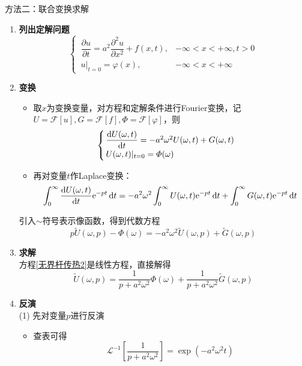 	\solveother 方法二：联合变换求解
\begin{enumerate}
	\item \textbf{列出定解问题}
	\begin{equation}
		\begin{cases}
			\, \dfrac{\partial u}{\partial t} = a^2 \dfrac{\partial^2 u}{\partial x^2} + f(x,t), & -\infty < x< +\infty,t>0\\[0.5em]
			\, u|_{t = 0} = \varphi(x), & -\infty < x < + \infty
		\end{cases}
	\end{equation}
	\item \textbf{变换}
		\begin{itemize}
			\item 取$x$为变换变量，对方程和定解条件进行Fourier变换，记$U = \mathcal{F}[u], G = \mathcal{F}[f], \varPhi = \mathcal{F}[\varphi]$，则
			\begin{equation}
				\begin{cases}
					\, \dfrac{{\rm{d}} U(\omega, t)}{{\rm{d}} t} = - a^2 \omega^2U(\omega, t) + G(\omega, t)\\
					\, U(\omega, t)|_{t = 0} = \varPhi(\omega)
				\end{cases}
			\end{equation}
			\item 再对变量$t$作Laplace变换：
			\begin{equation}
				\int_{0}^{\infty} \dfrac{{\rm{d}} U(\omega, t)}{{\rm{d}} t} {\rm{e}}^{- p t} \, {\rm{d}} t = -a^2\omega^2\int_{0}^{\infty} U(\omega, t){\rm{e}}^{-p t} \, {\rm{d}} t + \int_{0}^{\infty}G(\omega, t){\rm{e}}^{-pt}\, {\rm{d}} t
			\end{equation}
		\end{itemize}	
	引入$\sim$符号表示像函数，得到代数方程
	\begin{equation}
		p \widetilde{U}(\omega , p) - \varPhi(\omega) = -a^2 \omega^2 \widetilde{U}(\omega, p) + \widetilde{G}(\omega, p)
		\label{无界杆传热2}
	\end{equation}
	
	\item \textbf{求解}\\
	方程\eqref{无界杆传热2}是线性方程，直接解得
	\begin{equation}
		\widetilde{U}(\omega, p) = \dfrac{1}{p + a^2 \omega^2}\varPhi(\omega) + \dfrac{1}{p + a^2 \omega^2} \widetilde{G}(\omega, p)
	\end{equation}
	
	\item \textbf{反演}\\
	(1) 先对变量$p$进行反演
	\begin{itemize}
		\item 查表可得
		\[
		\mathcal{L}^{-1}\left[\dfrac{1}{p + a^2 \omega^2}\right] = \exp\left(-a^2 \omega^2 t\right)
		\]
		

\end{itemize}
\end{enumerate}

